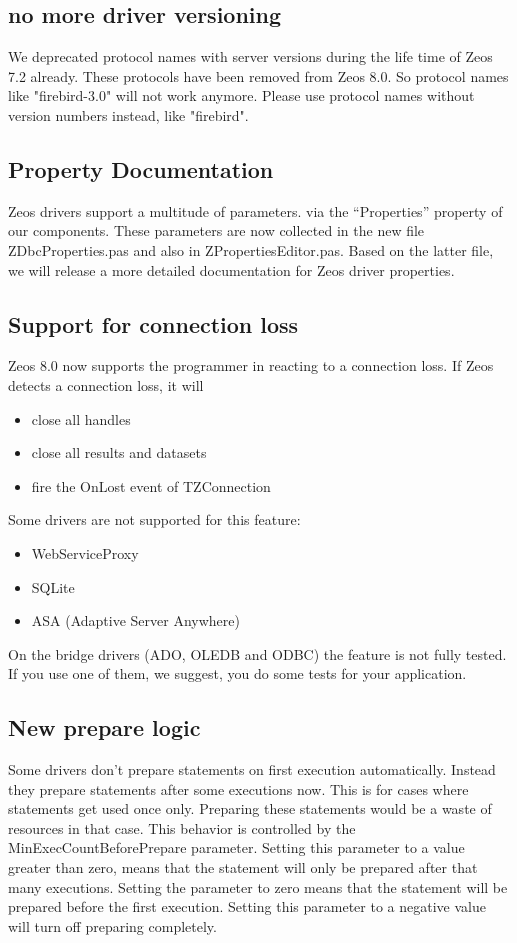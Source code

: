 \documentclass[a4paper,12pt,oneside]{article}
\begin{document}
\subsection{no more driver versioning}
We deprecated protocol names with server versions during the life time of Zeos 7.2 already.
These protocols have been removed from Zeos 8.0.
So protocol names like "firebird-3.0" will not work anymore.
Please use protocol names without version numbers instead, like "firebird".

\subsection{Property Documentation}
Zeos drivers support a multitude of parameters. via the "`Properties"' property of our components.
These parameters are now collected in the new file ZDbcProperties.pas and also in ZPropertiesEditor.pas.
Based on the latter file, we will release a more detailed documentation for Zeos driver properties.

\subsection{Support for connection loss}
Zeos 8.0 now supports the programmer in reacting to a connection loss.
If Zeos detects a connection loss, it will
\begin{itemize}
	\item close all handles
	\item close all results and datasets
	\item fire the OnLost event of TZConnection
\end{itemize}

Some drivers are not supported for this feature:
\begin{itemize}
	\item WebServiceProxy
	\item SQLite
	\item ASA (Adaptive Server Anywhere)
\end{itemize}

On the bridge drivers (ADO, OLEDB and ODBC) the feature is not fully tested.
If you use one of them, we suggest, you do some tests for your application.

\subsection{New prepare logic}
\label{subsec:NewPrepareLogic}
Some drivers don't prepare statements on first execution automatically.
Instead they prepare statements after some executions now.
This is for cases where statements get used once only.
Preparing these statements would be a waste of resources in that case.
This behavior is controlled by the MinExecCountBeforePrepare parameter.
Setting this parameter to a value greater than zero, means that the statement will only be prepared after that many executions.
Setting the parameter to zero means that the statement will be prepared before the first execution.
Setting this parameter to a negative value will turn off preparing completely.
\end{document}
